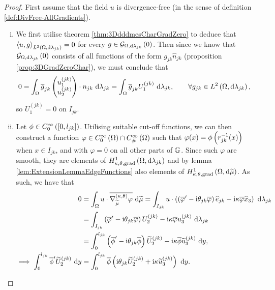\begin{proof}
	First assume that the field $u$ is divergence-free (in the sense of definition \ref{def:DivFree-AllGradients}).
	\begin{enumerate}[(i)]
		\item We first utilise theorem \ref{thm:3DdddmesCharGradZero} to deduce that $\left\langle u , g \right\rangle_{L^{2}\left( \Omega,\mathrm{d} \lambda_{jk} \right)}=0$ for every $g\in\mathcal{G}_{ \Omega, \mathrm{d}\lambda_{jk}}\left( 0 \right)$.
		Then since we know that $\mathcal{G}_{ \Omega, \mathrm{d}\lambda_{jk}}\left( 0 \right)$ consists of all functions of the form $g_{jk}\hat{n}_{jk}$ (proposition \ref{prop:3DGradZeroChar}), we must conclude that
		\begin{align*}
			0 &= \int_{\Omega} \overline{g}_{jk}\begin{pmatrix} u_1^{(jk)} \\ u_2^{(jk)} \end{pmatrix}\cdot n_{jk}  \ \mathrm{d}\lambda_{jk} 
			= \int_{\Omega} \overline{g}_{jk}U_1^{(jk)}  \ \mathrm{d}\lambda_{jk},
			\qquad \forall g_{jk}\in L^{2}\left( \Omega,\mathrm{d} \lambda_{jk} \right),
		\end{align*}
		so $U_1^{(jk)}=0$ on $I_{jk}$.
		\item Let $\phi\in C^{\infty}_{0}\left( \left[ 0,l_{jk} \right] \right)$.
		Utilising suitable cut-off functions, we can then construct a function $\varphi\in C^{\infty}_{0}\left( \Omega \right)\cap C^{\infty}_{\#}\left( \Omega \right)$ such that $\varphi(x)=\phi\left( r_{jk}^{-1}(x) \right)$ when $x\in I_{jk}$, and with $\varphi=0$ on all other parts of $\mathbb{G}$.
		Since such $\varphi$ are smooth, they are elements of $H^1_{\kappa,\theta,\mathrm{grad}}\left( \Omega, \mathrm{d}\lambda_{jk} \right)$ and by lemma \ref{lem:ExtensionLemmaEdgeFunctions} also elements of $H^1_{\kappa,\theta,\mathrm{grad}}\left( \Omega, \mathrm{d}\widetilde{\mu} \right)$.
		As such, we have that
		\begin{align*}
			0 &= \integral{\ddom}{ u\cdot\overline{\ktgrad_{\dddmes}\varphi} }{\dddmes}
			= \integral{I_{jk}}{ u\cdot\bracs{ \bracs{\overline{\varphi}' - \rmi\qm_{jk}\overline{\varphi}}\widehat{e}_{jk} - \rmi\wavenumber\overline{\varphi}\widehat{x}_3} }{\lambda_{jk}} \\
			&= \integral{I_{jk}}{ \bracs{\overline{\varphi}' - \rmi\qm_{jk}\overline{\varphi}}U_2^{(jk)} - \rmi\wavenumber\overline{\varphi}u_3^{(jk)} }{\lambda_{jk}} \\
			&= \int_0^{l_{jk}} \bracs{\overline{\phi}' - \rmi\qm_{jk}\overline{\phi}}\widetilde{U}_2^{(jk)} - \rmi\wavenumber\overline{\phi}\widetilde{u}_3^{(jk)} \ \md y, \\
			\implies
			\int_0^{l_{jk}} \overline{\phi}'\widetilde{U}_2^{(jk)} \ \md y
			&= \int_0^{l_{jk}} \overline{\phi}\bracs{ \rmi\qm_{jk}\widetilde{U}_2^{(jk)} + \rmi\wavenumber\widetilde{u}_3^{(jk)} } \ \md y.

\end{align*}
\end{enumerate}
\end{proof}
